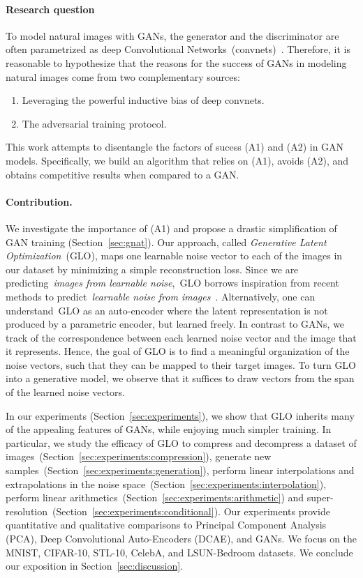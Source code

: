 \documentclass{article}
\newcommand{\GNAT}{GLO}
\begin{document}
\paragraph{Research question}
To model natural images with GANs, the generator and the discriminator are
often parametrized as deep Convolutional
Networks~(convnets)~\citep{lecun1998gradient}. Therefore, it is reasonable to
hypothesize that the reasons for the success of GANs in modeling natural images
come from two complementary sources:
\begin{enumerate}[label=(A\arabic*),start=1]
  \item Leveraging the powerful inductive bias of deep convnets.
  \item The adversarial training protocol.
\end{enumerate}
This work attempts to disentangle the factors of sucess (A1) and (A2) in GAN
models.  Specifically, we build an algorithm that relies on (A1), avoids (A2),
and obtains competitive results when compared to a GAN.

\paragraph{Contribution.}

We investigate the importance of (A1) and propose a drastic simplification
of GAN training (Section~\ref{sec:gnat}).
Our approach, called \emph{Generative Latent Optimization}~(\GNAT{}), maps one learnable noise vector
to each of the images in our dataset by minimizing a simple reconstruction
loss.
Since we are predicting~\emph{images from learnable noise},~\GNAT{} borrows
inspiration from recent methods to predict~\emph{learnable noise from
images}~\citep{nat}.
Alternatively, one can understand~\GNAT{} as an auto-encoder where the latent
representation is not produced by a parametric encoder, but learned freely.
In contrast to GANs,  we track of the correspondence between each learned noise
vector and the image that it represents.  Hence, the goal of \GNAT{} is to
find a meaningful organization of the noise vectors, such that they can be
mapped to their target images. To turn \GNAT{} into a generative model, we
observe that it suffices to draw vectors from the span of the learned noise vectors.

In our experiments (Section~\ref{sec:experiments}), we show
that \GNAT{} inherits many of the appealing features of GANs, while enjoying much
simpler training. In particular, we study the efficacy of \GNAT{} to compress and
decompress a dataset of images~(Section~\ref{sec:experiments:compression}),
generate new samples~(Section~\ref{sec:experiments:generation}), perform linear
interpolations and extrapolations in the noise
space~(Section~\ref{sec:experiments:interpolation}), perform linear
arithmetics~(Section~\ref{sec:experiments:arithmetic}) and
super-resolution~(Section~\ref{sec:experiments:conditional}).
Our experiments provide
quantitative and qualitative comparisons to Principal Component Analysis (PCA),
Deep Convolutional Auto-Encoders (DCAE), and GANs. We focus on the MNIST,
CIFAR-10, STL-10, CelebA, and LSUN-Bedroom datasets.
We conclude our exposition in Section~\ref{sec:discussion}.
\end{document}
